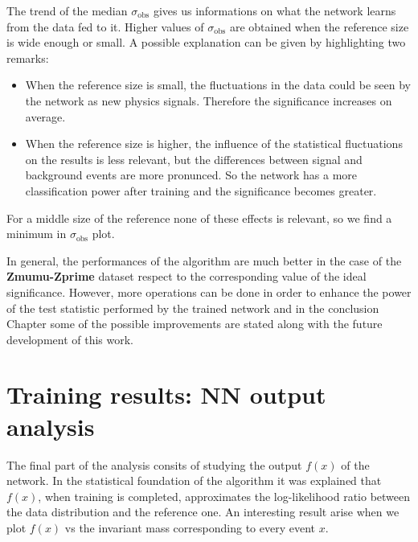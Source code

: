 The trend of the median $\sigma_\mathrm{obs}$ gives us informations on what the network learns from the data fed to it. Higher values of $\sigma_\mathrm{obs}$ are obtained when the reference size is wide enough or small. A possible explanation can be given by highlighting two remarks:
\begin{itemize}
	\item When the reference size is small, the fluctuations in the data could be seen by the network as new physics signals. Therefore the significance increases on average.
	\item When the reference size is higher, the influence of the statistical fluctuations on the results is less relevant, but the differences between signal and background events are more pronunced. So the network has a more classification power after training and the significance becomes greater.
\end{itemize}
For a middle size of the reference none of these effects is relevant, so we find a minimum in $\sigma_\mathrm{obs}$ plot.

In general, the performances of the algorithm are much better in the case of the \textbf{Zmumu-Zprime} dataset respect to the corresponding value of the ideal significance. However, more operations can be done in order to enhance the power of the test statistic performed by the trained network and in the conclusion Chapter some of the possible improvements are stated along with the future development of this work.





\section{Training results: NN output analysis}
The final part of the analysis consits of studying the output $f(x)$ of the network. In the statistical foundation of the algorithm it was explained that $f(x)$, when training is completed, approximates the log-likelihood ratio between the data distribution and the reference one. An interesting result arise when we plot $f(x)$ vs the invariant mass corresponding to every event $x$.

